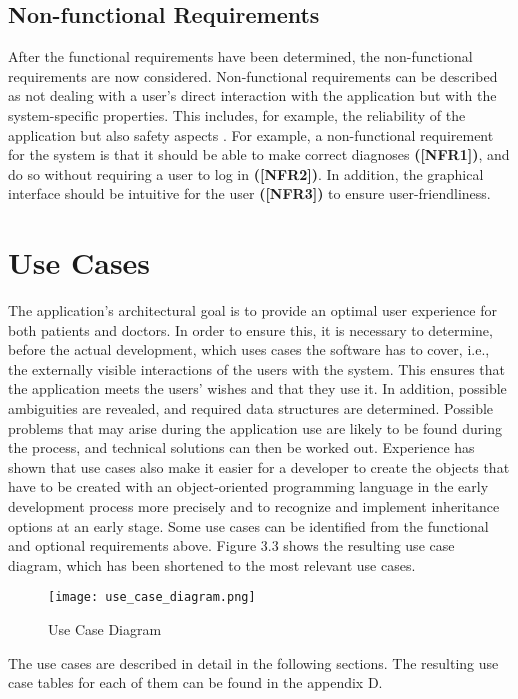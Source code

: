 \subsection{Non-functional Requirements}
After the functional requirements have been determined, the non-functional requirements are now considered. Non-functional requirements can be described as not dealing with a user's direct interaction with the application but with the system-specific properties. This includes, for example, the reliability of the application but also safety aspects \cite{.req2}. For example, a non-functional requirement for the system is that it should be able to make correct diagnoses \textbf{([NFR1])}, and do so without requiring a user to log in \textbf{([NFR2])}. In addition, the graphical interface should be intuitive for the user \textbf{([NFR3])} to ensure user-friendliness.



\section{Use Cases}
The application's architectural goal is to provide an optimal user experience for both patients and doctors. In order to ensure this, it is necessary to determine, before the actual development, which uses cases the software has to cover, i.e., the externally visible interactions of the users with the system. This ensures that the application meets the users' wishes and that they use it. In addition, possible ambiguities are revealed, and required data structures are determined. Possible problems that may arise during the application use are likely to be found during the process, and technical solutions can then be worked out. Experience has shown that use cases also make it easier for a developer to create the objects that have to be created with an object-oriented programming language in the early development process more precisely and to recognize and implement inheritance options at an early stage. Some use cases can be identified from the functional and optional requirements above. Figure 3.3 shows the resulting use case diagram, which has been shortened to the most relevant use cases. 

\begin{figure}[H]
	\centering
	\texttt{[image: use\_case\_diagram.png]}
	\caption[Use Case Diagram]{Use Case Diagram}
\end{figure}
\noindent
The use cases are described in detail in the following sections. The resulting use case tables for each of them can be found in the appendix D.

